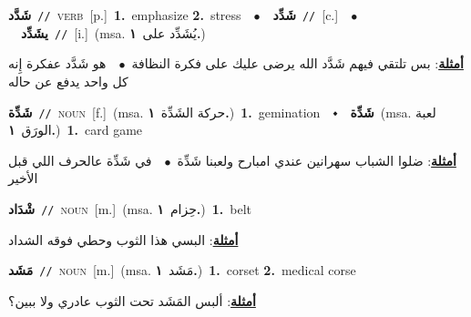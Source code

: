 \documentclass[10pt,a4paper,twoside]{article} %
\begin{document}
\begin{multicols}{2}
{\setlength\topsep{0pt}\textbf{\foreignlanguage{arabic}{شَدَّد}}\ {\color{gray}\texttt{//}\color{black}}\ \textsc{verb}\ [p.]\ \textbf{1.}~emphasize  \textbf{2.}~stress\ \ $\bullet$\ \ \setlength\topsep{0pt}\textbf{\foreignlanguage{arabic}{شَدِّد}}\ {\color{gray}\texttt{//}\color{black}}\ [c.]\ \ $\bullet$\ \ \setlength\topsep{0pt}\textbf{\foreignlanguage{arabic}{يشَدِّد}}\ {\color{gray}\texttt{//}\color{black}}\ [i.]\ \color{gray}(msa. \foreignlanguage{arabic}{يُشَدِّد على}~\foreignlanguage{arabic}{\textbf{١.}})\color{black}\  \begin{flushright}\color{gray}\foreignlanguage{arabic}{\textbf{\underline{\foreignlanguage{arabic}{أمثلة}}}: بس تلتقي فيهم شَدَّد الله يرضى عليك على فكرة النظافة\ $\bullet$\ \  هو شَدَّد عفكرة إِنه كل واحد يدفع عن حاله}\end{flushright}\color{black}} \vspace{2mm}

{\setlength\topsep{0pt}\textbf{\foreignlanguage{arabic}{شَدِّة}}\ {\color{gray}\texttt{//}\color{black}}\ \textsc{noun}\ [f.]\ \color{gray}(msa. \foreignlanguage{arabic}{حركة الشَدِّة}~\foreignlanguage{arabic}{\textbf{١.}})\color{black}\ \textbf{1.}~gemination\ \ $\smblkdiamond$\ \ \setlength\topsep{0pt}\textbf{\foreignlanguage{arabic}{شَدِّة}}\ \color{gray}(msa. \foreignlanguage{arabic}{لعبة الورَق}~\foreignlanguage{arabic}{\textbf{١.}})\color{black}\ \textbf{1.}~card game\  \begin{flushright}\color{gray}\foreignlanguage{arabic}{\textbf{\underline{\foreignlanguage{arabic}{أمثلة}}}: ضلوا الشباب سهرانين عندي امبارح ولعبنا شَدِّة\ $\bullet$\ \  في شَدِّة عالحرف اللي قبل الأخير}\end{flushright}\color{black}} \vspace{2mm}

{\setlength\topsep{0pt}\textbf{\foreignlanguage{arabic}{شْدَاد}}\ {\color{gray}\texttt{//}\color{black}}\ \textsc{noun}\ [m.]\ \color{gray}(msa. \foreignlanguage{arabic}{حِزام}~\foreignlanguage{arabic}{\textbf{١.}})\color{black}\ \textbf{1.}~belt\  \begin{flushright}\color{gray}\foreignlanguage{arabic}{\textbf{\underline{\foreignlanguage{arabic}{أمثلة}}}: البسي هذا الثوب وحطي فوقه الشداد}\end{flushright}\color{black}} \vspace{2mm}

{\setlength\topsep{0pt}\textbf{\foreignlanguage{arabic}{مَشَد}}\ {\color{gray}\texttt{//}\color{black}}\ \textsc{noun}\ [m.]\ \color{gray}(msa. \foreignlanguage{arabic}{مَشَد}~\foreignlanguage{arabic}{\textbf{١.}})\color{black}\ \textbf{1.}~corset  \textbf{2.}~medical corse\  \begin{flushright}\color{gray}\foreignlanguage{arabic}{\textbf{\underline{\foreignlanguage{arabic}{أمثلة}}}: ألبس المَشَد تحت الثوب عادري ولا ببين؟}\end{flushright}\color{black}} \vspace{2mm}


\end{multicols}
\end{document}
